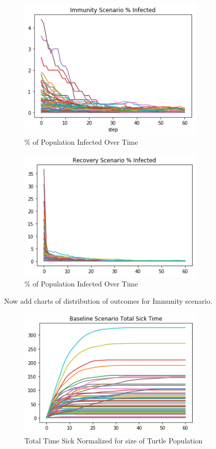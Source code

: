\documentclass[11pt]{article} %
\begin{document}
\begin{figure}
\centering
\includegraphics[width=0.8\textwidth]{immunity_steady_state}
\caption{\% of Population Infected Over Time}
\end{figure}


\begin{figure}
\centering
\includegraphics[width=0.8\textwidth]{recovery_steady_state}
\caption{\% of Population Infected Over Time}
\end{figure}

Now add charts of distribution of outcomes for Immunity scenario. 


\begin{figure}
\centering
\includegraphics[width=0.8\textwidth]{baseline_total_sicktime}
\caption{Total Time Sick Normalized for size of Turtle Population}
\end{figure}
\end{document}
